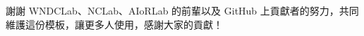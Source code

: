 \renewcommand{\acknowledgementname}{誌謝}
\clearpage
{}
\addchaptertocentry{\acknowledgementname}
\begin{acknowledgements}

謝謝 WNDCLab、NCLab、AIoRLab 的前輩以及 GitHub 上貢獻者的努力，共同維護這份模板，讓更多人使用，感謝大家的貢獻！

\end{acknowledgements} 